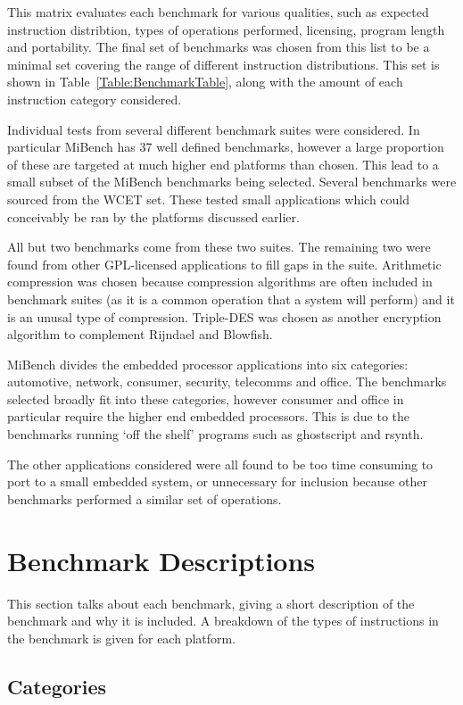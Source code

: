 \documentclass[twocolumn]{article}
\newcommand{\nsection}[1]{\section{\bfseries #1}}
\begin{document}
This matrix evaluates each benchmark for various qualities, such as expected instruction distribtion, types of operations performed, licensing, program length and portability. The final set of benchmarks was chosen from this list to be a minimal set covering the range of different instruction distributions. This set is shown in Table~\ref{Table:BenchmarkTable}, along with the amount of each instruction category considered.

Individual tests from several different benchmark suites were considered. In particular MiBench has 37 well defined benchmarks, however a large proportion of these are targeted at much higher end platforms than chosen. This lead to a small subset of the MiBench benchmarks being selected. Several benchmarks were sourced from the WCET set. These tested small applications which could conceivably be ran by the platforms discussed earlier.

All but two benchmarks come from these two suites. The remaining two were found from other GPL-licensed applications to fill gaps in the suite. Arithmetic compression was chosen because compression algorithms are often included in benchmark suites (as it is a common operation that a system will perform) and it is an unusal type of compression. Triple-DES was chosen as another encryption algorithm to complement Rijndael and Blowfish.

MiBench divides the embedded processor applications into six categories: automotive, network, consumer, security, telecomms and office. The benchmarks selected broadly fit into these categories, however consumer and office in particular require the higher end embedded processors. This is due to the benchmarks running `off the shelf' programs such as ghostscript and rsynth.

The other applications considered were all found to be too time consuming to port to a small embedded system, or unnecessary for inclusion because other benchmarks performed a similar set of operations.


\nsection{Benchmark Descriptions}

This section talks about each benchmark, giving a short description of the benchmark and why it is included. A breakdown of the types of instructions in the benchmark is given for each platform.

\subsection*{Categories}
\end{document}
